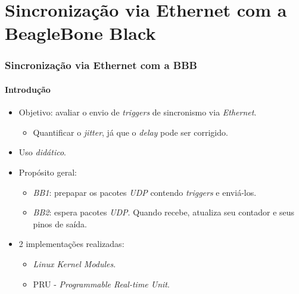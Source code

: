 \section {Sincronização via Ethernet com a BeagleBone Black}

\begin{frame}
\frametitle{Sincronização via Ethernet com a BBB }
\framesubtitle{Introdução}
\begin{itemize}
  \item Objetivo: avaliar o envio de \textit{triggers} de sincronismo via
  \textit{Ethernet}.
  \begin{itemize}
    \item Quantificar o \textit{jitter}, já que o \textit{delay} pode ser
    corrigido.
  \end{itemize}
  \item Uso \textit{didático}.
  \item Propósito geral:
  \begin{itemize}
  \item \textit{BB1}: prepapar os
  pacotes \textit{UDP} contendo \textit{triggers} e enviá-los.
  
  \item \textit{BB2}: espera pacotes \textit{UDP}. Quando recebe, atualiza seu
  contador e seus pinos de saída.
  \end{itemize}
  \item 2 implementações realizadas: 
  \begin{itemize}
    \item \textit{Linux Kernel Modules}.
    \item PRU - \textit{Programmable Real-time Unit}.
  \end{itemize}
\end{itemize}
\end{frame}

